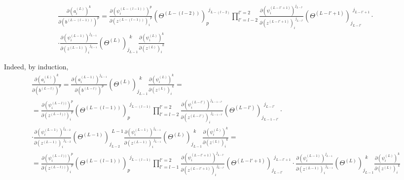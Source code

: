 \documentclass[10pt]{amsart}
\begin{document}
\begin{multicols*}{2}
\begin{equation}
\boxed{ \begin{gathered}
\frac{ \partial ( a_i^{(L)})^k }{ \partial (b^{(L-(l-1))})^p} = \frac{ \partial ( \psi_i^{(L-(l-1))})^{ p } }{ \partial (z^{(L-(l-1))})_i^{\  \  p } }  ( \Theta^{(L-(l-2))})_{ p }^{\  \  j_{L- (l-2)  }} \prod_{l'=l-2}^{l'=2 }  \frac{ \partial ( \psi_i^{(L-l'+1)})^{ j_{L-l'} } }{ \partial (z^{(L-l'+1)})_i^{\  \  j_{L-l'} } }  ( \Theta^{(L-l'+1)})_{ j_{L-l'} }^{\  \  j_{L-l'+1}} \cdot \\
\cdot \frac{ \partial ( \psi_i^{(L-1)})^{ j_{L-1} } }{ \partial (z^{(L-1)})_i^{\  \  j_{L-1} } }  ( \Theta^{(L)})_{ j_{L-1} }^{\  \  k} \frac{ \partial ( \psi_i^{(L)})^{ k } }{ \partial (z^{(L)})_i^{\  \  k } }       
\end{gathered} }
\end{equation}

Indeed, by induction, 
\[
\begin{gathered}
\frac{ \partial ( a_i^{(L)})^k }{ \partial (b^{(L-l)})^p} = \frac{ \partial ( a_i^{(L-1)})^{ j_{L-1} } }{ \partial (b^{(L-l)})^{    p } }  ( \Theta^{(L)})_{ j_{L-1} }^{\  \  k} \frac{ \partial ( \psi_i^{(L)})^{ k } }{ \partial (z^{(L)})_i^{\  \  k } }   = \\
=  \frac{ \partial ( \psi_i^{(L-l))})^{ p } }{ \partial (z^{(L-l))})_i^{\  \  p } }  ( \Theta^{(L-(l-1))})_{ p }^{\  \  j_{L- (l-1)  }} \prod_{l'=l-2}^{l'=2 }  \frac{ \partial ( \psi_i^{(L-l')})^{ j_{L-1-l'} } }{ \partial (z^{(L-l')})_i^{\  \  j_{L-1-l'} } }  ( \Theta^{(L-l')})_{ j_{L-1-l'} }^{\  \  j_{L-l'}} \cdot \\
\cdot \frac{ \partial ( \psi_i^{(L-1)})^{ j_{L-2} } }{ \partial (z^{(L-1)})_i^{\  \  j_{L-2} } }  ( \Theta^{(L-1)})_{ j_{L-2} }^{\  \  L-1} \frac{ \partial ( \psi_i^{(L-1)})^{ j_{L-1} } }{ \partial (z^{(L-1)})_i^{\  \  j_{L-1} } } ( \Theta^{(L)})_{ j_{L-1} }^{\  \  k} \frac{ \partial ( \psi_i^{(L)})^{ k } }{ \partial (z^{(L)})_i^{\  \  k } }       = \\
= \frac{ \partial ( \psi_i^{(L-l))})^{ p } }{ \partial (z^{(L-l))})_i^{\  \  p } }  ( \Theta^{(L-(l-1))})_{ p }^{\  \  j_{L- (l-1)  }} \prod_{l'=l-1}^{l'=2 }  \frac{ \partial ( \psi_i^{(L-l'+1)})^{ j_{L-l'} } }{ \partial (z^{(L-l'+1)})_i^{\  \  j_{L-l'} } }  ( \Theta^{(L-l'+1)})_{ j_{L-l'} }^{\  \  j_{L-l'+1}} \cdot  \frac{ \partial ( \psi_i^{(L-1)})^{ j_{L-1} } }{ \partial (z^{(L-1)})_i^{\  \  j_{L-1} } }  ( \Theta^{(L)})_{ j_{L-1} }^{\  \  k} \frac{ \partial ( \psi_i^{(L)})^{ k } }{ \partial (z^{(L)})_i^{\  \  k } }       
\end{gathered}
\]


\end{multicols*}
\end{document}
